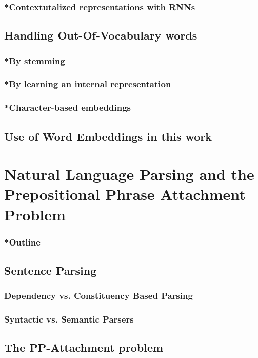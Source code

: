 \subsubsection{*Contextutalized representations with RNNs}
\subsection{Handling Out-Of-Vocabulary words}
\subsubsection{*By stemming}
\subsubsection{*By learning an internal representation}
\subsubsection{*Character-based embeddings}
\subsection{Use of Word Embeddings in this work}
\pagebreak


\section{Natural Language Parsing and the Prepositional Phrase Attachment Problem}
\subsubsection{*Outline}
\subsection{Sentence Parsing}
\subsubsection{Dependency vs. Constituency Based Parsing}
\subsubsection{Syntactic vs. Semantic Parsers}
\subsection{The PP-Attachment problem}
